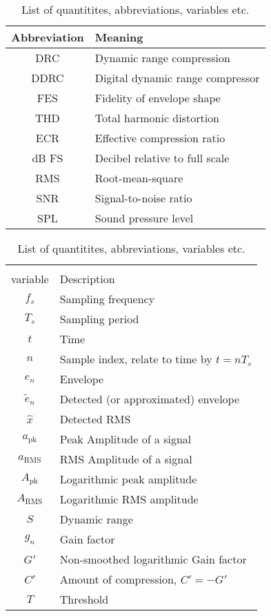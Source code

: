 \documentclass[../main2.tex]{subfiles}
\begin{document}
\begin{table}[h]
\begin{center}
\caption{List of quantitites, abbreviations, variables etc.}
\label{tab:list_of_quantities}
\begin{tabular}{| c | l |}
	\hline
	Abbreviation & Meaning \\ \hline
	DRC & Dynamic range compression \\
	DDRC & Digital dynamic range compressor \\
	FES & Fidelity of envelope shape \\
	THD & Total harmonic distortion \\
	ECR & Effective compression ratio \\
	dB FS & Decibel relative to full scale \\
	RMS & Root-mean-square \\
	SNR & Signal-to-noise ratio \\
	SPL & Sound pressure level \\
	\hline
\end{tabular}
\end{center}
\begin{center}
\begin{tabular}{| c | l |}
	\hline
	\tblbox{Quantity/\\variable} & Description \\ \hline
	$f_s$ & Sampling frequency \\
	$T_s$ & Sampling period \\
	$t$ & Time \\
	$n$ & Sample index, relate to time by $t = nT_s$ \\
	$e_n$ & Envelope \\
	$\tilde{e}_n$ & Detected (or approximated) envelope\\
	$\hat{x}$ & Detected RMS \\
	$a_\text{pk}$ & Peak Amplitude of a signal \\
	$a_\text{RMS}$ & RMS Amplitude of a signal \\
	$A_\text{pk}$ & Logarithmic peak amplitude\\
	$A_\text{RMS}$ & Logarithmic RMS amplitude\\
	$S$ & Dynamic range\\
	$g_n$ & Gain factor\\
	$G'$ & Non-smoothed logarithmic Gain factor\\
	$C'$ & Amount of compression, $C' = -G'$ \\
	$T$ & Threshold\\

\end{tabular}
\end{center}
\end{table}
\end{document}
